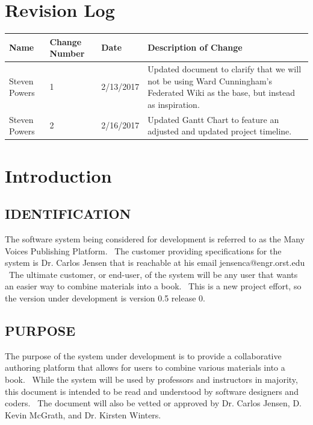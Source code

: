 \documentclass[onecolumn, draftclsnofoot,10pt, compsoc]{IEEEtran}
\begin{document}
\section{Revision Log}
\begin{flushleft}
\tablehead{}
\begin{supertabular}{|p{3cm}|p{3cm}|p{3cm}|p{7cm}|}
\hline
Name & Change Number & Date & Description of Change
\\\hline
Steven Powers & 1 & 2/13/2017 & Updated document to clarify  that we will not be using Ward Cunningham's Federated Wiki as the base, but instead as inspiration.
\\\hline
Steven Powers & 2 & 2/16/2017 & Updated Gantt Chart to feature an adjusted and updated project timeline.
\\ \hline

\end{supertabular}
\end{flushleft}



\section[Introduction]{Introduction}

\subsection[IDENTIFICATION]{IDENTIFICATION}


{\noindent
The software system being considered for development is referred to as the Many Voices
Publishing Platform. \ The customer providing specifications
for the system is Dr. Carlos Jensen that is reachable at his email jensenca@engr.orst.edu \
The ultimate customer, or end-user, of the system will be any user that wants an easier
way to combine materials into a book. \ This is a new project effort, so the
version under development is version 0.5 release 0.}

\subsection[PURPOSE]{PURPOSE}

{\noindent
The purpose of the system under
development is to provide a collaborative authoring platform that allows for users to
combine various materials into a book. \ While the system will be used by professors and
instructors in majority, this document is intended to be read and understood by software
designers and coders. \ The document will also be vetted or
approved by Dr. Carlos Jensen, D. Kevin McGrath, and Dr. Kirsten Winters.}
\end{document}
